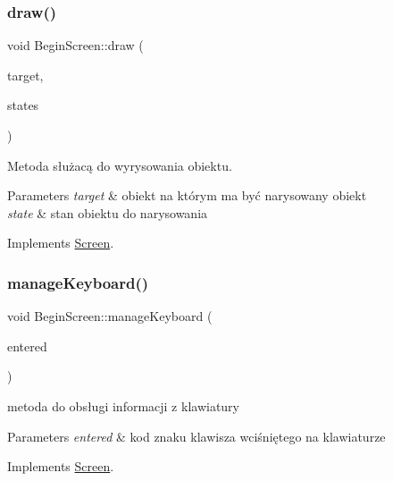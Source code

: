 \subsubsection{\texorpdfstring{draw()}{draw()}}
{\footnotesize\ttfamily void Begin\+Screen\+::draw (\begin{DoxyParamCaption}\item[{Render\+Target \&}]{target,  }\item[{Render\+States}]{states }\end{DoxyParamCaption})\hspace{0.3cm}{\ttfamily [virtual]}}



Metoda służacą do wyrysowania obiektu. 


\begin{DoxyParams}{Parameters}
{\em target} & obiekt na którym ma być narysowany obiekt \\
\hline
{\em state} & stan obiektu do narysowania \\
\hline
\end{DoxyParams}


Implements \mbox{\hyperlink{class_screen_ab9f74bb4bf0d0ee2a8280354ba0ff85e}{Screen}}.

\mbox{\label{class_begin_screen_a7f35b82f9f7ecceb5d45a33298812285}} 
\subsubsection{\texorpdfstring{manageKeyboard()}{manageKeyboard()}}
{\footnotesize\ttfamily void Begin\+Screen\+::manage\+Keyboard (\begin{DoxyParamCaption}\item[{sf\+::\+Uint32}]{entered }\end{DoxyParamCaption})\hspace{0.3cm}{\ttfamily [virtual]}}



metoda do obsługi informacji z klawiatury 


\begin{DoxyParams}{Parameters}
{\em entered} & kod znaku klawisza wciśniętego na klawiaturze \\
\hline
\end{DoxyParams}


Implements \mbox{\hyperlink{class_screen_a5b385381d2ba942567f4317e916c9951}{Screen}}.

